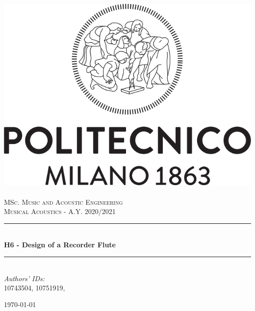\documentclass[a4paper]{article}
\title{}
\author{}
\begin{document}
\begin{titlepage}	
	\newcommand{\HRule}{\rule{\linewidth}{0.5mm}} %
	
	\center %
	
	
	\includegraphics[width=.4\textwidth]{Logo_Politecnico_Milano.png}\\[0.4cm]
	\textsc{\LARGE}\\[0.3cm] %
	
	\textsc{\large MSc. Music and Acoustic Engineering}\\[1cm] %
	
	\textsc{\Large Musical Acoustics - A.Y. 2020/2021}\\[0.5cm] %
	
	
	\HRule\\[0.4cm]
	
	{\huge\bfseries H6 - Design of a Recorder Flute }\\[0.4cm] %
	
	\HRule\\[1.5cm]
	
	
	
	{\large\textit{Authors' IDs:}}\\
	10743504, 10751919, %
	
	
	\vfill\vfill\vfill %
	
	{\large\today} %
	
	
	\vfill\vfill
	
	
	\vfill %
	
	
\end{titlepage}
\end{document}
